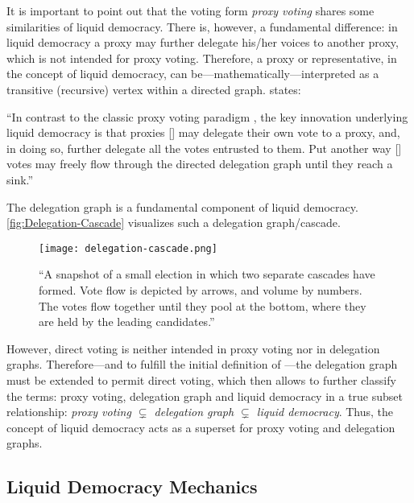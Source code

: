 It is important to point out that the voting form \textit{proxy voting} shares some similarities of liquid democracy. There is, however, a fundamental difference: in liquid democracy a proxy may further delegate his/her voices to another proxy, which is not intended for proxy voting. Therefore, a proxy or representative, in the concept of liquid democracy, can be---mathematically---interpreted as a transitive (recursive) vertex within a directed graph. \citeauthor{Kahng2018} states:

\begin{displayquote}
“In contrast to the classic proxy voting paradigm \parencite{Miller1969}, the key innovation underlying liquid democracy is that proxies [\textellipsis] may delegate their own vote to a proxy, and, in doing so, further delegate all the votes entrusted to them. Put another way [\textellipsis] votes may freely flow through the directed delegation graph until they reach a sink.”\\[1mm]
\hspace*{\fill}\textcite{Kahng2018}
\end{displayquote}

\newpage

The delegation graph is a fundamental component of liquid democracy. \autoref{fig:Delegation-Cascade} visualizes such a delegation graph/cascade. 

\begin{figure}[H]
\centering
\texttt{[image: delegation-cascade.png]}
	\caption[Delegate cascade voting]{“A snapshot of a small election in which two separate cascades have formed. Vote flow is depicted by arrows, and volume by numbers. The votes flow together until they pool at the bottom, where they are held by the leading candidates.” \parencite{Allen2008}}
	\label{fig:Delegation-Cascade}
\end{figure}
However, direct voting is neither intended in proxy voting nor in delegation graphs. Therefore---and to fulfill the initial definition of ---the delegation graph must be extended to permit direct voting, which then allows to further classify the terms: proxy voting, delegation graph and liquid democracy in a true subset relationship: \textit{proxy voting \(\subsetneq\) delegation graph \(\subsetneq\) liquid democracy}. Thus, the concept of liquid democracy acts as a superset for proxy voting and delegation graphs. 

\subsection{Liquid Democracy Mechanics}
\label{ssec:Liquid_Democracy_Mechanics}

